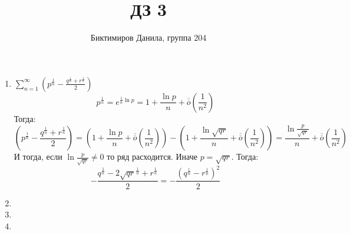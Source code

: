 \documentclass[11pt]{article}
\begin{document}
	
	\author{Биктимиров Данила, группа 204}
	\title{ДЗ 3}
	\date{}
	\maketitle
	
	\medskip
	
	\begin{enumerate}
		
		\item $\sum_{n=1}^{\infty} \left(p^{\frac{1}{n}}-\frac{q^{\frac{1}{n}} + r^{\frac{1}{n}}}{2} \right)$
		$$p^{\frac{1}{n}} = e^{\frac{1}{n}\ln p}=1+\frac{\ln p}{n} + \overline{\overline{o}} \left(\frac{1}{n^2}\right)$$
		Тогда: $$ \left(p^{\frac{1}{n}} - \frac{q^{\frac{1}{n}} + r^{\frac{1}{n}}}{2} \right) = \left(1+\frac{\ln p}{n} + \overline{\overline{o}} \left(\frac{1}{n^2}\right)\right)-\left( 1+\frac{\ln \sqrt{qr}}{n} + \overline{\overline{o}} \left(\frac{1}{n^2}\right) \right)=\frac{\ln{\frac{p}{\sqrt{qr}}}}{n}+\overline{\overline{o}}\left(\frac{1}{n^2}\right)$$
		И тогда, если $\ln \frac{p}{\sqrt{qr}}\not=0$ то ряд расходится. Иначе $p=\sqrt{qr}$. Тогда: $$-\frac{q^\frac{1}{n}-2\sqrt{qr}^{\frac{1}{n}}+r^\frac{1}{n}}{2}=-\frac{\left(q^{\frac{1}{n}}-r^{\frac{1}{n}}\right)^2}{2}$$
		\item
		
		\item
		
		\item
		
	\end{enumerate}
\end{document}
